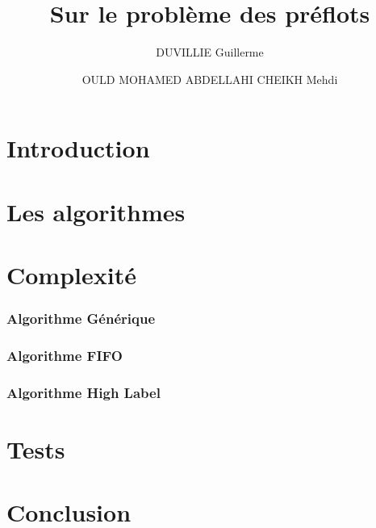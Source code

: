 

\author{DUVILLIE Guillerme \and OULD MOHAMED ABDELLAHI CHEIKH Mehdi}
\title{Sur le problème des préflots}



\maketitle
\newpage

\tableofcontents
\newpage

\part{Introduction}


\part{Les algorithmes}


\part{Complexité}
\section{Algorithme Générique}


\section{Algorithme FIFO}


\section{Algorithme High Label}


\part{Tests}


\part{Conclusion}


\nocite{*}

\newpage




